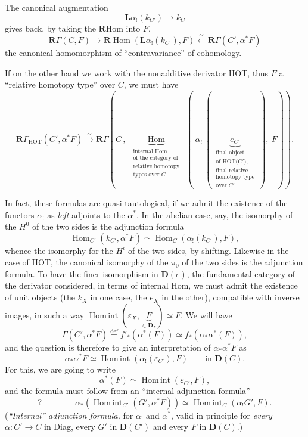 \documentclass[11pt]{article}
\newcommand{\printedpage}[1]{\marginpar{\footnotesize p.~#1}}
\newcommand{\msp}[1]{\marginpar{\footnotesize [#1]}}
\newcommand{\Homint}{\operatorname{Hom\,int}}
\begin{document}
\msp{page 8}
The canonical augmentation
\[ \mathbf{L}\alpha_!(k_{C'}) \longrightarrow k_C \]
gives back, by taking the $\mathbf{R}\mathrm{Hom}$ into $F$,
\[ \mathbf{R}\Gamma(C,F) \longrightarrow \mathbf{R}\operatorname{Hom}(\mathbf{L}\alpha_!(k_{C'}), F) \xleftarrow{\ \sim\ } \mathbf{R}\Gamma(C', \alpha^*F) \]
the canonical homomorphism of ``contravariance'' of cohomology.

If on the other hand we work with the nonadditive derivator HOT, thus $F$ a ``relative homotopy type'' over $C$, we must have
\[ \boxed{\mathbf{R}\Gamma_{\mathrm{HOT}}(C', \alpha^*F) \xrightarrow{\ \sim\ } \mathbf{R}\Gamma(C\,,\ \underbrace{\operatorname{Hom}}_{\substack{\text{internal Hom}\\ \text{of the category of}\\ \text{relative homotopy}\\ \text{types over $C$}}}\ (\ \alpha_!\ (\ \underbrace{e_{C'}}_{\substack{\text{final object}\\ \text{of HOT($C'$),}\\ \text{final relative}\\ \text{homotopy type}\\ \text{over $C'$}}}\ ),\ F)).} \]

\printedpage{6}
In fact, these formulas are quasi-tautological, if we admit the existence of the functors $\alpha_!$ as \textit{left} adjoints to the $\alpha^*$. In the abelian case, say,
\msp{page 9}
the isomorphy of the $H^0$ of the two sides is the adjunction formula
\[ \operatorname{Hom}_{C'}(k_{C'}, \alpha^*F) \simeq \operatorname{Hom}_C(\alpha_!(k_{C'}), F), \]
whence the isomorphy for the $H^i$ of the two sides, by shifting. Likewise in the case of HOT, the canonical isomorphy of the $\pi_0$ of the two sides is the adjunction formula. To have the finer isomorphism in $\mathbf{D}(e)$, the fundamental category of the derivator considered, in terms of internal Hom, we must admit the existence of unit objects (the $k_X$ in one case, the $e_X$ in the other), compatible with inverse images, in such a way $\Homint(\varepsilon_X, \underbrace{F}_{\in\mathbf{D}_X}) \simeq F$. We will have
\[ \Gamma(C', \alpha^*F) \overset{\text{def}}{=} f'_*(\alpha^*(F)) \simeq f_*(\alpha_*\alpha^*(F)), \]
and the question is therefore to give an interpretation of $\alpha_*\alpha^*F$ as
\[ \alpha_*\alpha^*F \simeq \Homint(\alpha_!(\varepsilon_{C'}), F) \qquad \text{in } \mathbf{D}(C). \]
For this, we are going to write
\[ \alpha^*(F) \simeq \Homint(\varepsilon_{C'}, F), \]
and the formula must follow from an ``internal adjunction formula''
\msp{page 10}
\[ ? \qquad\qquad \boxed{\alpha_*(\Homint_{C'}(G', \alpha^*F)) \simeq \Homint_C(\alpha_!G', F).} \]
(\textit{``Internal'' adjunction formula,} for $\alpha_!$ and $\alpha^*$, valid in principle for \textit{every} $\alpha : C' \longrightarrow C$ in Diag, every $G'$ in $\mathbf{D}(C')$ and every $F$ in $\mathbf{D}(C)$.)
\end{document}
